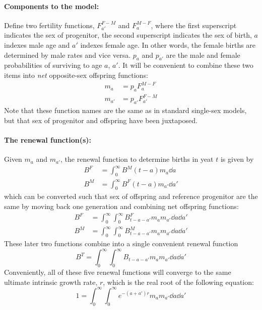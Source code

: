 \label{sec:pollardage}
\paragraph{Components to the model: }
Define two fertility functions, $F_{a'}^{F-M}$ and $F_a^{M-F}$, where the first
superscript indicates the sex of progenitor, the second superscript indicates
the sex of birth, $a$ indexes male age and $a'$ indexes female age. In
other words, the female births are determined by male rates and vice versa.
$p_a$ and $p_{a'}$ are the male and female probabilities of surviving to age 
$a$, $a'$. It will be convenient to combine these two items into \textit{net}
opposite-sex offspring functions:
\begin{align}
m_a &= p_aF_a^{M-F}\\
m_{a'} &= p_{a'}F_{a'}^{F-M}
\end{align}
Note that these function names are the same as in standard single-sex models,
but that sex of progenitor and offspring have been juxtaposed.
\paragraph{The renewal function(s): }
Given $m_a$ and $m_{a'}$, the renewal function to determine births in yeat $t$
is given by
\begin{align}
B^F &= \int_0^\infty B^M(t-a)m_a \dd a\\
B^M &= \int_0^\infty B^F(t-a)m_{a'} \dd a'
\end{align}
which can be converted such that sex of offspring and reference
progenitor are the same by moving back one generation and combining net
offspring functions:
\begin{align}
B^F &= \int_0^\infty \int_0^\infty B^F_{t-a-a'} m_am_{a'}\dd a \dd a'\\
B^M &= \int_0^\infty \int_0^\infty B^M_{t-a-a'} m_am_{a'}\dd a \dd a'
\end{align}
These later two functions combine into a single convenient renewal function
\begin{equation}
B^T = \int_0^\infty \int_0^\infty B_{t-a-a'}m_am_{a'}\dd a \dd a'
\end{equation}
Conveniently, all of these five renewal functions will converge to the same
ultimate intrinsic growth rate, $r$, which is the real root of the following equation: 
\begin{equation}
1 = \int_0^\infty \int_0^\infty e^{-(a+a')r}m_am_{a'}\dd a \dd a'
\end{equation}

